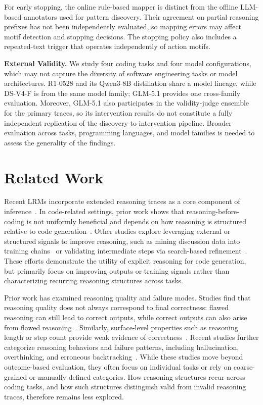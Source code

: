 \documentclass[acmsmall,screen,review,anonymous]{acmart}
\begin{document}
For early stopping, the online rule-based mapper is distinct from the offline LLM-based annotators used for pattern discovery. Their agreement on partial reasoning prefixes has not been independently evaluated, so mapping errors may affect motif detection and stopping decisions. The stopping policy also includes a repeated-text trigger that operates independently of action motifs.

\textbf{External Validity.}
We study four coding tasks and four model configurations, which may not capture the diversity of software engineering tasks or model architectures. R1-0528 and its Qwen3-8B distillation share a model lineage, while DS-V4-F is from the same model family; GLM-5.1 provides one cross-family evaluation. Moreover, GLM-5.1 also participates in the validity-judge ensemble for the primary traces, so its intervention results do not constitute a fully independent replication of the discovery-to-intervention pipeline. Broader evaluation across tasks, programming languages, and model families is needed to assess the generality of the findings.

\section{Related Work}

Recent LRMs incorporate extended reasoning traces as a core component of inference~\cite{deepseekr1}. In code-related settings, prior work shows that reasoning-before-coding is not uniformly beneficial and depends on how reasoning is structured relative to code generation~\cite{revisitcotcodegen}. Other studies explore leveraging external or structured signals to improve reasoning, such as mining discussion data into training chains~\cite{svrc2026} or validating intermediate steps via search-based refinement~\cite{mctsrefine2025}. These efforts demonstrate the utility of explicit reasoning for code generation, but primarily focus on improving outputs or training signals rather than characterizing recurring reasoning structures across tasks.

Prior work has examined reasoning quality and failure modes. Studies find that reasoning quality does not always correspond to final correctness: flawed reasoning can still lead to correct outputs, while correct outputs can also arise from flawed reasoning~\cite{cotcodequality}. Similarly, surface-level properties such as reasoning length or step count provide weak evidence of correctness~\cite{reasoningsteps2026}. Recent studies further categorize reasoning behaviors and failure patterns, including hallucination, overthinking, and erroneous backtracking~\cite{thinkingpatterns,reasoninghallucination2025,demystifyingerrors2025}. While these studies move beyond outcome-based evaluation, they often focus on individual tasks or rely on coarse-grained or manually defined categories. How reasoning structures recur across coding tasks, and how such structures distinguish valid from invalid reasoning traces, therefore remains less explored.
\end{document}
